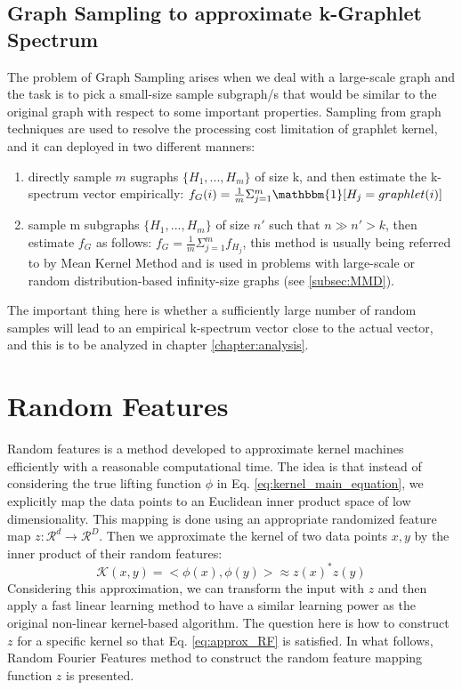 \subsection{Graph Sampling to approximate k-Graphlet Spectrum}
\label{graph_sampling}
The problem of Graph Sampling arises when we deal with a large-scale graph and the task is to pick a small-size sample subgraph/s that would be similar to the original graph with respect to some important properties.\newline
Sampling from graph techniques are used to resolve the processing cost limitation of graphlet kernel, and it can deployed in two different manners:
\begin{enumerate} \itemsep0pt \parskip0pt 
    \item directly sample $m$ sugraphs $\{H_1,...,H_m\}$ of size k, and then estimate the k-spectrum vector empirically:
    $f_G(i)=\frac{1}{m}\Sigma_{j=1}^m \mathbbm{1}[H_j=graphlet(i)]$
    \item sample m subgraphs  $\{H_1,...,H_m\}$ of size $n'$ such that $n\gg n'>k$, then estimate $f_G$ as follows:
    $f_G=\frac{1}{m}\Sigma_{j=1}^m f_{H_j}$, this method is usually being referred to by Mean Kernel Method and is used in problems with large-scale or random distribution-based infinity-size graphs (see \ref{subsec:MMD}).
\end{enumerate}  
The important thing here is whether a sufficiently large number of random samples will lead to an empirical k-spectrum vector close to the actual vector, and this is to be analyzed in chapter \ref{chapter:analysis}.

\section{Random Features}
Random features is a method developed to approximate kernel machines efficiently with a reasonable computational time. The idea is that instead of considering the true lifting function $\phi$ in Eq. \ref{eq:kernel_main_equation}, we explicitly map the data points to an Euclidean inner product space of low dimensionality. This mapping is done using an appropriate randomized feature map $z:\mathcal{R}^d \xrightarrow{}\mathcal{R}^D$. Then we approximate the kernel of two data points $x, y$ by the inner product of their random features:
\begin{equation}
\label{eq:approx_RF}
\mathcal{K}(x,y)=<\phi(x),\phi(y)> \approx z(x)^*z(y)
\end{equation}
Considering this approximation, we can transform the input with $z$ and then apply a fast linear learning method to have a similar learning power as the original non-linear kernel-based algorithm. \newline
The question here is how to construct $z$ for a specific kernel so that Eq. \ref{eq:approx_RF} is satisfied. In what follows, Random Fourier Features method to construct the random feature mapping function $z$ is presented.

